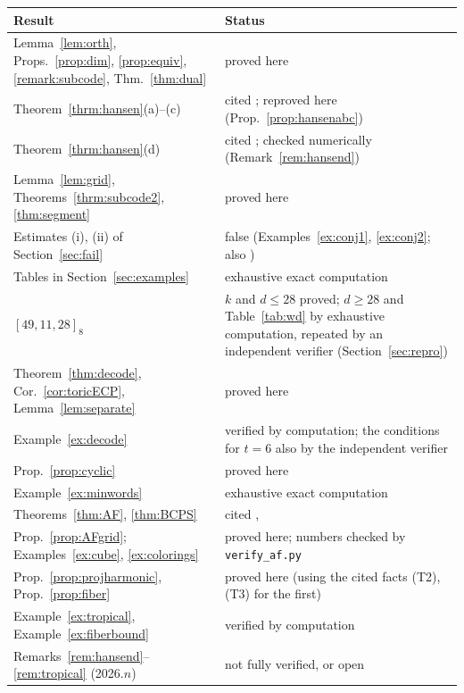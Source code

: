 \documentclass[12pt,letterpaper]{article}
\numberwithin{equation}{section}
\theoremstyle{definition}
\theoremstyle{remark}
\begin{document}
\begin{center}
\small
\begin{tabular}{@{}p{}p{}@{}}
\toprule
Result & Status\\
\midrule
Lemma~\ref{lem:orth}, Props.~\ref{prop:dim}, \ref{prop:equiv},
\ref{remark:subcode}, Thm.~\ref{thm:dual} & proved here\\
Theorem~\ref{thrm:hansen}(a)--(c) & cited \cite{Ha02}; reproved here
(Prop.~\ref{prop:hansenabc})\\
Theorem~\ref{thrm:hansen}(d) & cited \cite{Ha02}; checked numerically
(Remark~\ref{rem:hansend})\\
Lemma~\ref{lem:grid}, Theorems~\ref{thrm:subcode2}, \ref{thm:segment} &
proved here\\
Estimates (i), (ii) of Section~\ref{sec:fail} & false (Examples~\ref{ex:conj1},
\ref{ex:conj2}; also \cite{Ru07})\\
Tables in Section~\ref{sec:examples} & exhaustive exact computation\\
$[49,11,28]_8$ & $k$ and $d\le28$ proved; $d\ge28$ and
Table~\ref{tab:wd} by exhaustive computation, repeated by an independent
verifier (Section~\ref{sec:repro})\\
Theorem~\ref{thm:decode}, Cor.~\ref{cor:toricECP}, Lemma~\ref{lem:separate}
& proved here\\
Example~\ref{ex:decode} & verified by computation; the conditions for
$t=6$ also by the independent verifier\\
Prop.~\ref{prop:cyclic} & proved here\\
Example~\ref{ex:minwords} & exhaustive exact computation\\
Theorems~\ref{thm:AF}, \ref{thm:BCPS} & cited \cite{AF93}, \cite{BCPS18}\\
Prop.~\ref{prop:AFgrid}; Examples~\ref{ex:cube}, \ref{ex:colorings} & proved
here; numbers checked by \texttt{verify\_af.py}\\
Prop.~\ref{prop:projharmonic}, Prop.~\ref{prop:fiber} & proved here (using the
cited facts (T2), (T3) for the first)\\
Example~\ref{ex:tropical}, Example~\ref{ex:fiberbound} & verified by
computation\\
Remarks~\ref{rem:hansend}--\ref{rem:tropical} (2026.$n$) & not fully verified, or
open\\
\bottomrule
\end{tabular}
\end{center}
\end{document}
